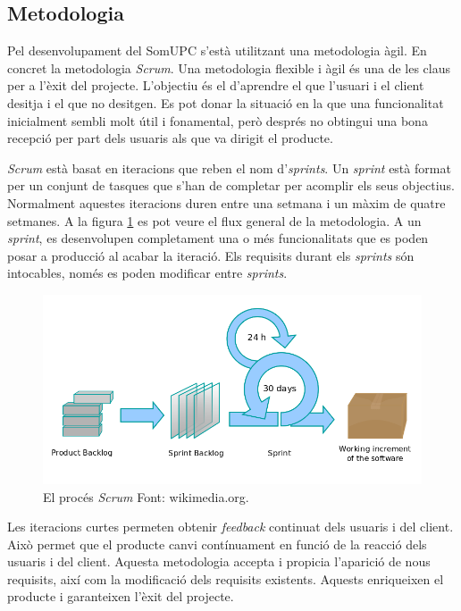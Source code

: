 \subsection{Metodologia}

Pel desenvolupament del SomUPC s'està utilitzant una metodologia àgil. En concret la metodologia \textit{Scrum}. Una metodologia flexible i àgil és una de les claus per a l'èxit del projecte. L'objectiu és el d'aprendre el que l'usuari i el client desitja i el que no desitgen. Es pot donar la situació en la que una funcionalitat inicialment sembli molt útil i fonamental, però després no obtingui una bona recepció per part dels usuaris als que va dirigit el producte.

\textit{Scrum} està basat en iteracions que reben el nom d'\textit{sprints}. Un \textit{sprint} està format per un conjunt de tasques que s'han de completar per acomplir els seus objectius. Normalment aquestes iteracions duren entre una setmana i un màxim de quatre setmanes. A la figura \ref{fig:scrum} es pot veure el flux general de la metodologia. A un \textit{sprint}, es desenvolupen completament una o més funcionalitats que es poden posar a producció al acabar la iteració. Els requisits durant els \textit{sprints} són intocables, només es poden modificar entre \textit{sprints}.


\begin{figure}[ht]
    \centering
    \includegraphics*[scale=0.5]{GestioProjecte/Metodologia/scrum.png}
    \caption[El procés \textit{Scrum}]{El procés \textit{Scrum} Font: wikimedia.org.}
    \label{fig:scrum}
\end{figure}
\FloatBarrier 

Les iteracions curtes permeten obtenir \textit{feedback} continuat dels usuaris i del client. Això permet que el producte canvi contínuament en funció de la reacció dels usuaris i del client. Aquesta metodologia accepta i propicia l'aparició de nous requisits, així com la modificació dels requisits existents. Aquests enriqueixen el producte i garanteixen l'èxit del projecte.

